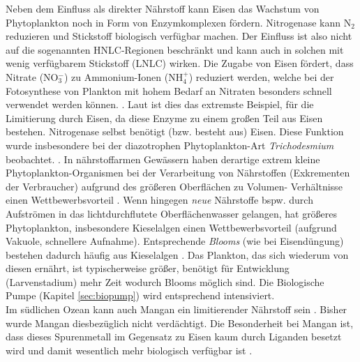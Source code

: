 \documentclass[12pt,a4paper,onecolumn,draft]{scrartcl}
\begin{document}
Neben dem Einfluss als direkter Nährstoff kann Eisen das Wachstum von Phytoplankton noch in Form von Enzymkomplexen fördern. Nitrogenase kann N$_2$ reduzieren und Stickstoff biologisch verfügbar machen. Der Einfluss ist also nicht auf die sogenannten HNLC-Regionen beschränkt und kann auch in solchen mit wenig verfügbarem Stickstoff (LNLC) wirken. Die Zugabe von Eisen fördert, dass Nitrate (NO$_3^-$) zu Ammonium-Ionen (NH$_4^+$) reduziert werden, welche bei der Fotosynthese von Plankton mit hohem Bedarf an Nitraten besonders schnell verwendet werden können.  \citep{Emerson.2009}. Laut \citet{Emerson.2009} ist dies das extremste Beispiel, für die Limitierung durch Eisen, da diese Enzyme zu einem großen Teil aus Eisen bestehen. Nitrogenase selbst benötigt (bzw. besteht aus) Eisen. Diese Funktion wurde insbesondere bei der diazotrophen Phytoplankton-Art \textit{Trichodesmium} beobachtet. \citep{Falkowski.1998}.  In nährstoffarmen Gewässern haben derartige extrem kleine Phytoplankton-Organismen bei der Verarbeitung von Nährstoffen (Exkrementen der Verbraucher)  aufgrund des größeren Oberflächen zu Volumen- Verhältnisse einen Wettbewerbsvorteil \citep{Falkowski.1998}. Wenn hingegen \textit{neue} Nährstoffe bspw. durch Aufströmen in das lichtdurchflutete Oberflächenwasser gelangen, hat größeres Phytoplankton, insbesondere Kieselalgen einen Wettbewerbsvorteil (aufgrund Vakuole, schnellere Aufnahme). Entsprechende \textit{Blooms} (wie bei Eisendüngung) bestehen dadurch häufig aus Kieselalgen \citep{Boyd.2007}. Das Plankton, das sich wiederum von diesen ernährt, ist typischerweise größer, benötigt für Entwicklung (Larvenstadium) mehr Zeit wodurch Blooms möglich sind. Die Biologische Pumpe (Kapitel \ref{sec:biopump}) wird entsprechend intensiviert. \\

Im südlichen Ozean kann auch Mangan ein limitierender Nährstoff sein \citep{Browning.2021}. Bisher wurde Mangan diesbezüglich nicht verdächtigt. Die Besonderheit bei Mangan ist, dass dieses Spurenmetall im Gegensatz zu Eisen kaum durch Liganden besetzt wird und damit wesentlich mehr biologisch verfügbar ist \citep{Emerson.2009}. 
\end{document}

